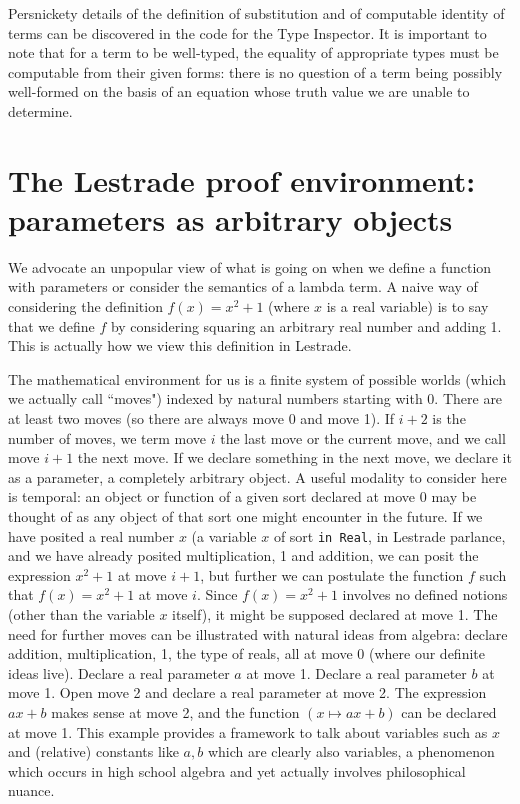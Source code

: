 \documentclass[12pt]{article}
\begin{document}
Persnickety details of the definition of substitution and of computable identity of terms can be discovered in the code for the Type Inspector.  It is important to note that for a term to be well-typed, the equality of appropriate types must be computable from their given forms:  there is no question of a term being possibly well-formed on the basis of an equation whose truth value we are unable to determine.

\section{The Lestrade proof environment:  parameters as arbitrary objects}

We advocate an unpopular view of what is going on when we define a function with parameters or consider the semantics of a lambda term.  A naive way of considering the definition 
$f(x) = x^2+1$ (where $x$ is a real variable) is to say that we define $f$ by considering squaring an arbitrary real number and adding 1.  This is actually how we view this definition in Lestrade.

The mathematical environment for us is a finite system of possible worlds (which we actually call ``moves") indexed by natural numbers starting with 0.  There are at least two moves
(so there are always move 0 and move 1).  If $i+2$ is the number of moves, we term move $i$ the last move or the current move, and we call move $i+1$ the next move.
If we declare something in the next move, we declare it as a parameter, a completely arbitrary object.  A useful modality to consider here is temporal:  an object
or function of a given sort declared at move 0 may be thought of as any object of that sort one might encounter in the future.  If we have posited a real number $x$ (a variable $x$ of sort {\tt in Real}, in Lestrade parlance, and we have already posited multiplication, 1 and addition, we can posit the expression $x^2+1$ at move $i+1$, but further we can postulate the function $f$ such that $f(x)=x^2+1$ at move $i$.  Since $f(x) = x^2+1$ involves no defined notions (other than the variable $x$ itself), it might be supposed declared at move 1.
The need for further moves can be illustrated with natural ideas from algebra:  declare addition, multiplication, 1, the type of reals, all at move 0 (where our definite ideas live).
Declare a real parameter $a$ at move 1.  Declare a real parameter $b$ at move 1.  Open move 2 and declare a real parameter at move 2.  The expression $ax+b$ makes sense
at move 2, and the function $(x \mapsto ax+b)$ can be declared at move 1.  This example provides a framework to talk about variables such as $x$ and (relative) constants like $a,b$ which are clearly also variables, a phenomenon which occurs in high school algebra and yet actually involves philosophical nuance.
\end{document}
